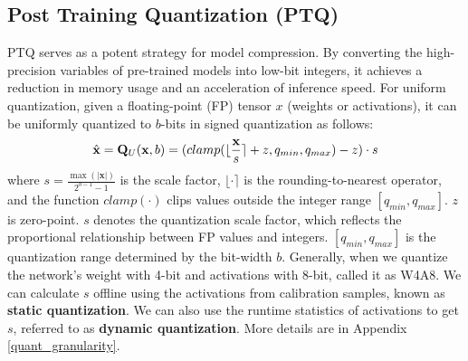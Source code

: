 \subsection{Post Training Quantization (PTQ)}
\vspace{-2mm}


PTQ serves as a potent strategy for model compression. By
converting the high-precision variables of pre-trained models into low-bit integers, it achieves a reduction in memory
usage and an acceleration of inference speed. For uniform quantization, given a floating-point (FP) tensor $x$ (weights or activations), it can be uniformly quantized to $b$-bits in signed quantization as follows:
\vspace{-2mm}
\begin{equation}\label{eq:quant}
    \hat{\mathbf{x}} = \mathbf{Q}_U(\mathbf{x},b) =(clamp(\lfloor \frac{\mathbf{x}}{s} \rceil+z, q_{min}, q_{max}) - z) \cdot s
\vspace{-2mm}
\end{equation} 
where $s=\frac{\max(|\mathbf{x}|)}{2^{b-1}-1}$ is the scale factor, $\lfloor \cdot \rceil$ is the rounding-to-nearest operator, and the function $clamp(\cdot)$ clips values outside the integer range $\left[q_{min}, q_{max} \right]$. $z$ is zero-point. $s$ denotes the quantization scale factor, which reflects the proportional relationship between FP values and integers. $\left[q_{min}, q_{max} \right]$ is the quantization range determined by the bit-width $b$. Generally, when we quantize the network's weight with 4-bit and activations with 8-bit, called it as W4A8. We can calculate $s$ offline using the activations from calibration samples, known as \textbf{static quantization}. We can also use the runtime statistics of activations to get $s$, referred to as \textbf{dynamic quantization}.  More details are in Appendix \ref{quant_granularity}.

